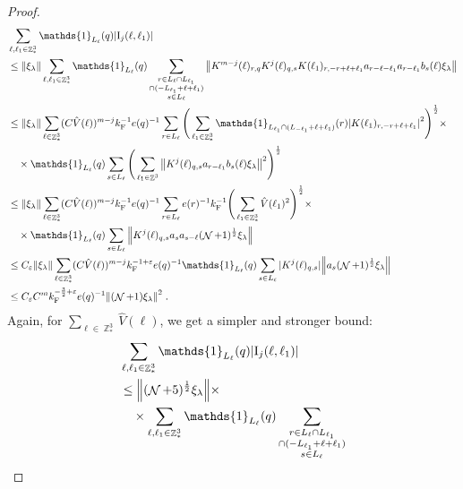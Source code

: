 \documentclass[12pt,a4paper]{article}
\numberwithin{equation}{section}
\newcommand{\1}{\mathbb{I}}
\newcommand{\F}{\mathrm{F}}
\newcommand{\I}{\mathrm{I}}
\DeclareMathOperator{\Z}{\mathbb{Z}}
\DeclareMathOperator{\NN}{\mathcal{N}}
\newcommand{\half}{\frac{1}{2}}
\theoremstyle{plain}
\theoremstyle{definition}
\theoremstyle{remark}
\theoremstyle{plain}
\theoremstyle{definition}
\theoremstyle{remark}
\begin{document}
\begin{proof}
\textcolor{green!30!black}{
\begin{align}
	&\sum_{\ell,\ell_1 \in \Z^3_*} \mathds{1}_{L_\ell}(q) |\I_j(\ell, \ell_1)| \nonumber\\
	&\leq \norm{ \xi_\lambda} \sum_{\ell,\ell_1 \in \Z^3_*} \mathds{1}_{L_\ell}(q)
		\sum\limits_{\substack{r\in L_{\ell} \cap L_{\ell_1} \\ \cap (-L_{\ell_1} + \ell + \ell_1)\\s\in L_{\ell}}}
		\norm{K^{m-j}(\ell)_{r,q} K^j(\ell)_{q,s} K(\ell_1)_{r,-r+\ell+\ell_1} a_{r-\ell-\ell_1} a_{r-\ell_1} b_{s}(\ell) \xi_\lambda }\nonumber\\
	&\leq \norm{ \xi_\lambda} 
		\sum_{\ell \in \Z^3_*}
		(C \hat{V}(\ell))^{m-j} k_{\F}^{-1} e(q)^{-1}
		\sum\limits_{r \in L_\ell} \Bigg(\sum_{\ell_1 \in \Z^3_*} \mathds{1}_{L_{\ell_1} \cap (L_{-\ell_1}+\ell+\ell_1)}(r) \abs{ K(\ell_1)_{r,-r+\ell+\ell_1} }^2\Bigg)^\half \times\nonumber\\ 
	&\quad \times \mathds{1}_{L_\ell}(q) \sum\limits_{s\in L_{\ell}} \Bigg( \sum_{\ell_1 \in \Z^3} \norm{K^{j}(\ell)_{q,s} a_{r-\ell_1} b_{s}(\ell) \xi_\lambda }^2 \Bigg)^\half \nonumber\\
	&\leq \norm{ \xi_\lambda} 
		\sum_{\ell \in \Z^3_*}
		(C \hat{V}(\ell))^{m-j} k_{\F}^{-1} e(q)^{-1}
		\sum\limits_{r \in L_\ell} e(r)^{-1} k_{\F}^{-1} \Bigg(\sum_{\ell_1 \in \Z^3_*} \hat{V}(\ell_1)^2 \Bigg)^\half \times\nonumber\\ 
	&\quad \times \mathds{1}_{L_\ell}(q) \sum\limits_{s\in L_{\ell}} \norm{K^{j}(\ell)_{q,s} a_s a_{s-\ell} (\NN+1)^{\half} \xi_\lambda } \nonumber\\
	&\leq C_\varepsilon \norm{ \xi_\lambda} 
		\sum_{\ell \in \Z^3_*}
		(C \hat{V}(\ell))^{m-j} k_{\F}^{-1+\varepsilon} e(q)^{-1}
		\mathds{1}_{L_\ell}(q)
		\sum\limits_{s\in L_{\ell}} |K^{j}(\ell)_{q,s}| \norm{a_s (\NN+1)^{\half} \xi_\lambda } \nonumber\\
	&\leq C_\varepsilon C^m k_{\F}^{-\frac 32 + \varepsilon} e(q)^{-1} \norm{(\NN+1) \xi_\lambda }^2 \;. \label{eq:estEQ1122_Coulomb}
\end{align}
}
Again, for $ \sum_{\ell \in \Z^3_*} \hat{V}(\ell) $, we get a simpler and stronger bound:
\begin{align}
	&\sum_{\ell,\ell_1 \in \Z^3_*} \mathds{1}_{L_\ell}(q) |\I_j(\ell, \ell_1)| \nonumber\\
	&\leq \norm{ (\NN+5)^{\half} \xi_\lambda} \times \nonumber\\
	&\quad \times \sum_{\ell,\ell_1 \in \Z^3_*} \mathds{1}_{L_\ell}(q) \sum\limits_{\substack{r\in L_{\ell} \cap L_{\ell_1} \\ \cap (-L_{\ell_1} + \ell + \ell_1)\\s\in L_{\ell}}}

\end{align}
\end{proof}
\end{document}
